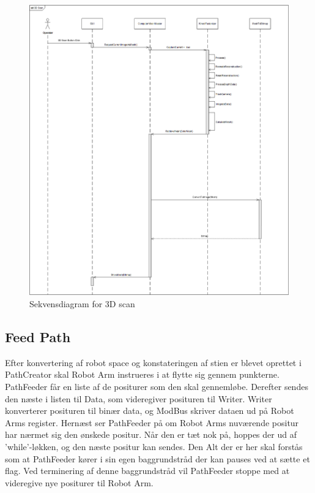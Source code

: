 \begin{figure}[H]
    \centering
    \includegraphics[width=1\textwidth]{figurer/d/Design/Sequence/sd_3Dscan}
    \caption{Sekvensdiagram for 3D scan}
    \label{sd_3Dscan}
\end{figure}

\subsection{Feed Path}
Efter konvertering af robot space og konstateringen af stien er blevet oprettet i PathCreator skal Robot Arm instrueres i at flytte sig gennem punkterne.
PathFeeder får en liste af de positurer som den skal gennemløbe. Derefter sendes den næste i listen til Data, som videregiver posituren til Writer.
Writer konverterer posituren til binær data, og ModBus skriver dataen ud på Robot Arms register.
Hernæst ser PathFeeder på om Robot Arms nuværende positur har nærmet sig den ønskede positur. 
Når den er tæt nok på, hoppes der ud af 'while'-løkken, og den næste positur kan sendes.
Den Alt der er her skal forstås som at PathFeeder kører i sin egen baggrundstråd der kan pauses ved at sætte et flag. 
Ved terminering af denne baggrundstråd vil PathFeeder stoppe med at videregive nye positurer til Robot Arm.

